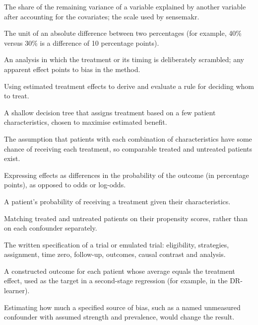 \begin{description}[style=nextline, leftmargin=1.2em, itemsep=3pt, font=\normalfont\bfseries]
\item[Partial $R^2$]
The share of the remaining variance of a variable explained by another variable after accounting for the covariates; the scale used by sensemakr.

\item[Percentage points]
The unit of an absolute difference between two percentages (for example, 40\% versus 30\% is a difference of 10 percentage points).

\item[Placebo test]
An analysis in which the treatment or its timing is deliberately scrambled; any apparent effect points to bias in the method.

\item[Policy learning]
Using estimated treatment effects to derive and evaluate a rule for deciding whom to treat.

\item[Policy tree]
A shallow decision tree that assigns treatment based on a few patient characteristics, chosen to maximise estimated benefit.

\item[Positivity (overlap)]
The assumption that patients with each combination of characteristics have some chance of receiving each treatment, so comparable treated and untreated patients exist.

\item[Probability scale]
Expressing effects as differences in the probability of the outcome (in percentage points), as opposed to odds or log-odds.

\item[Propensity score]
A patient's probability of receiving a treatment given their characteristics.

\item[Propensity-score matching]
Matching treated and untreated patients on their propensity scores, rather than on each confounder separately.

\item[Protocol]
The written specification of a trial or emulated trial: eligibility, strategies, assignment, time zero, follow-up, outcomes, causal contrast and analysis.

\item[Pseudo-outcome]
A constructed outcome for each patient whose average equals the treatment effect, used as the target in a second-stage regression (for example, in the DR-learner).

\item[Quantitative bias analysis]
Estimating how much a specified source of bias, such as a named unmeasured confounder with assumed strength and prevalence, would change the result.


\end{description}
